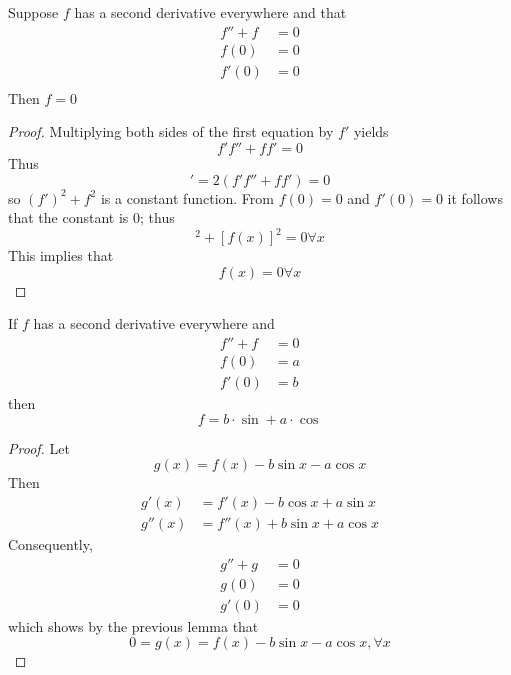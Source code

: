 \documentclass[12pt, a4paper, oneside, openright, titlepage]{book}
\begin{document}
\begin{subappendices}
    \begin{lem}
        Suppose $f$ has a second derivative everywhere and that \begin{align*}
            f''+f&= 0\\
            f(0) &= 0\\
            f'(0) &= 0\\
        \end{align*}
        Then $f = 0$
    \end{lem}
    \begin{proof}
        Multiplying both sides of the first equation by $f'$ yields \begin{equation*}
            f'f'' + ff' = 0
        \end{equation*}
        Thus \begin{equation*}
            [(f')^2+f^2]' = 2(f'f'' + ff') = 0
        \end{equation*}
        so $(f')^2+f^2$ is a constant function. From $f(0) = 0$ and $f'(0) = 0$ it follows that the constant is $0$; thus \begin{equation*}
            [f'(x)]^2+[f(x)]^2=0\forall x
        \end{equation*}
        This implies that \begin{equation*}
            f(x) = 0 \forall x
        \end{equation*}
    \end{proof}

    \begin{thm}
        If $f$ has a second derivative everywhere and \begin{align*}
            f'' + f &= 0 \\
            f(0) &= a \\
            f'(0) &= b 
        \end{align*}
        then \begin{equation*}
            f = b\cdot \sin + a \cdot \cos
        \end{equation*}
    \end{thm}
    \begin{proof}
        Let \begin{equation*}
            g(x) = f(x) - b\sin x - a \cos x
        \end{equation*}
        Then \begin{align*}
            g'(x) &= f'(x) - b\cos x + a \sin x \\
            g''(x) &= f''(x) + b\sin x + a\cos x
        \end{align*}
        Consequently, \begin{align*}
            g'' + g &= 0 \\
            g(0) &= 0 \\
            g'(0) &= 0
        \end{align*}
        which shows by the previous lemma that \begin{equation*}
            0 = g(x) = f(x) - b\sin x - a\cos x, \forall x
        \end{equation*}
    \end{proof}



\end{subappendices}
\end{document}
